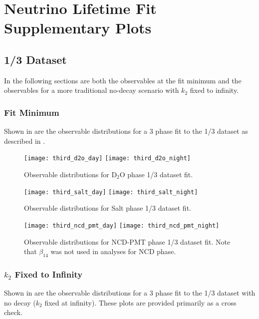 \chapter{Neutrino Lifetime Fit Supplementary Plots}

\section{1/3 Dataset}
\label{third_observables}

In the following sections are both the observables at the fit minimum and the observables for a more traditional no-decay scenario with $k_2$ fixed to infinity. 

\subsection{Fit Minimum}

Shown in  are the observable distributions for a 3 phase fit to the 1/3 dataset as described in .

\begin{figure}
\centering
\texttt{[image: third\_d2o\_day]}
\texttt{[image: third\_d2o\_night]}
\caption{\label{fig:third_d2o_obs}Observable distributions for D$_2$O phase 1/3 dataset fit.}
\end{figure}
\begin{figure}
\centering
\texttt{[image: third\_salt\_day]}
\texttt{[image: third\_salt\_night]}
\caption{\label{fig:third_salt_obs}Observable distributions for Salt phase 1/3 dataset fit.}
\end{figure}
\begin{figure}
\centering
\texttt{[image: third\_ncd\_pmt\_day]}
\texttt{[image: third\_ncd\_pmt\_night]}
\caption{\label{fig:third_ncd_pmt_obs}Observable distributions for NCD-PMT phase 1/3 dataset fit. Note that $\beta_{14}$ was not used in analyses for NCD phase.}
\end{figure}

\clearpage

\subsection{$k_2$ Fixed to Infinity}

Shown in  are the observable distributions for a 3 phase fit to the 1/3 dataset with no decay ($k_2$ fixed at infinity). These plots are provided primarily as a cross check.

